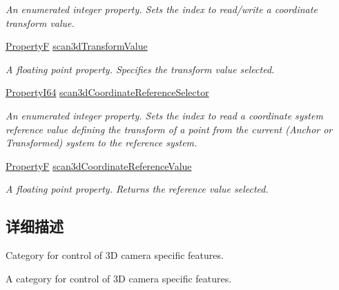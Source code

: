 \begin{DoxyCompactItemize}
\begin{DoxyCompactList}\small\item\em An enumerated integer property. Sets the index to read/write a coordinate transform value. \end{DoxyCompactList}\item 
\hyperlink{group___common_interface_gaf54865fe5a3d5cfd15f9a111b40d09f9}{Property\+F} \hyperlink{classmv_i_m_p_a_c_t_1_1acquire_1_1_gen_i_cam_1_1_scan3d_control_a71eef75f73a7f863b0c134a3a6a2bc24}{scan3d\+Transform\+Value}
\begin{DoxyCompactList}\small\item\em A floating point property. Specifies the transform value selected. \end{DoxyCompactList}\item 
\hyperlink{group___common_interface_ga81749b2696755513663492664a18a893}{Property\+I64} \hyperlink{classmv_i_m_p_a_c_t_1_1acquire_1_1_gen_i_cam_1_1_scan3d_control_a007f2b580137fc2c75a196dcc331607a}{scan3d\+Coordinate\+Reference\+Selector}
\begin{DoxyCompactList}\small\item\em An enumerated integer property. Sets the index to read a coordinate system reference value defining the transform of a point from the current (Anchor or Transformed) system to the reference system. \end{DoxyCompactList}\item 
\hyperlink{group___common_interface_gaf54865fe5a3d5cfd15f9a111b40d09f9}{Property\+F} \hyperlink{classmv_i_m_p_a_c_t_1_1acquire_1_1_gen_i_cam_1_1_scan3d_control_ae70e808138fa8cc06015ca25aeff21c5}{scan3d\+Coordinate\+Reference\+Value}
\begin{DoxyCompactList}\small\item\em A floating point property. Returns the reference value selected. \end{DoxyCompactList}\end{DoxyCompactItemize}


\subsection{详细描述}
Category for control of 3\+D camera specific features. 

A category for control of 3\+D camera specific features. 

